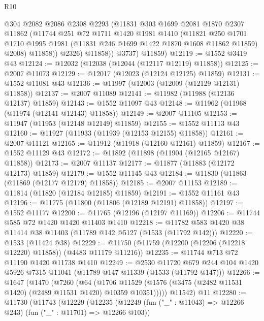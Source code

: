 \begin{lexlean}{R10}
\begin{coremodule}
              @304
              @2082
              @2086
              @2308
              @2293
              (@11831
                @303
                @1699
                @2081
                @1870
                @2307
                @11862
                (@11744
                  @251
                  @72
                  @1711
                  @1420
                  @1981
                  @1410
                  (@11821
                    @250
                    @1701
                    @1710
                    @1995
                    @1981
                    (@11831 @246 @1699 @1422 @1870 @1608 @11862 @11859)
                    @2008)
                  @11858))
              @2326)
            @11858))
        @3737)
      @11859)
@12119 := @1552 @3419 @43
@12124 := @12032 (@12038 (@12044 (@12117 @12119) @11858))
@12125 := @2007 @11073
@12129 := @12017 (@12023 (@12124 @12125) @11859)
@12131 := @1552 @11081 @43
@12136 := @11997 (@12003 (@12009 (@12129 @12131) @11858))
@12137 := @2007 @11089
@12141 := @11982 (@11988 (@12136 @12137) @11859)
@12143 := @1552 @11097 @43
@12148 := @11962 (@11968 (@11974 (@12141 @12143) @11858))
@12149 := @2007 @11105
@12153 := @11947 (@11953 (@12148 @12149) @11859)
@12155 := @1552 @11113 @43
@12160 := @11927 (@11933 (@11939 (@12153 @12155) @11858))
@12161 := @2007 @11121
@12165 := @11912 (@11918 (@12160 @12161) @11859)
@12167 := @1552 @11129 @43
@12172 := @11892 (@11898 (@11904 (@12165 @12167) @11858))
@12173 := @2007 @11137
@12177 := @11877 (@11883 (@12172 @12173) @11859)
@12179 := @1552 @11145 @43
@12184 := @11830 (@11863 (@11869 (@12177 @12179) @11858))
@12185 := @2007 @11153
@12189 := @11814 (@11820 (@12184 @12185) @11859)
@12191 := @1552 @11161 @43
@12196 := @11775 (@11800 (@11806 (@12189 @12191) @11858))
@12197 := @1552 @11177
@12200 := @11765 (@12196 (@12197 @11169))
@12206 := @11744 @585 @72 @1420 @1420 @11403 @1410
@12218 := @11782 @583 @1420 @38 @11414 @38 @11403 (@11789 @142 @5127 (@1533 (@11792 @142)))
@12220 := @1533 (@11424 @38)
@12229 := @11750 (@11759 (@12200 (@12206 (@12218 @12220) @11858)) (@4483 @11179 @11216))
@12235 := @11744 @713 @72 @11190 @1420 @11738 @1410
@12249 := @2530
    @11720
    @679
    @244
    @104
    @1420
    @5926
    @7315
    @11041
    (@11789 @147 @11339 (@1533 (@11792 @147)))
@12266 := @1647
    (@1470
      (@7260
        (@64
          (@1706 @11529 (@1576 (@3475 (@2482 @11531 @1420) (@2489 @11531 @1420) @10359 @10351)))))
      @11542)
    @11
@12280 := @11730
    (@11743
      (@12229
        (@12235
          (@12249 (fun ("_" : @11043) => @12266 @243) (fun ("_" : @11701) => @12266 @103))

\end{coremodule}
\end{lexlean}
